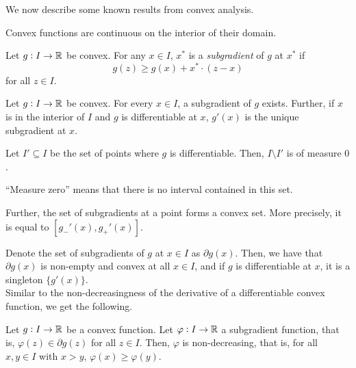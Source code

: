 		We now describe some known results from convex analysis.

		\begin{fact}
			Convex functions are continuous on the interior of their domain.
		\end{fact}

		\begin{definition}
			Let $g : I \to \mathbb{R}$ be convex. For any $x \in I$, $x^*$ is a \emph{subgradient} of $g$ at $x^*$ if
			\[ g(z) \ge g(x) + x^*\cdot(z-x) \]
			for all $z \in I$.
		\end{definition}


		\begin{fact}
			Let $g : I \to \mathbb{R}$ be convex. For every $x \in I$, a subgradient of $g$ exists. Further, if $x$ is in the interior of $I$ and $g$ is differentiable at $x$, $g'(x)$ is the unique subgradient at $x$.
		\end{fact}

		\begin{fact}
			Let $I' \subseteq I$ be the set of points where $g$ is differentiable. Then, $I \setminus I'$ is of measure $0$.
		\end{fact}
		``Measure zero'' means that there is no interval contained in this set.

		\begin{fact}
			 Further, the set of subgradients at a point forms a convex set. More precisely, it is equal to $[g_-'(x),g_+'(x)]$.
		\end{fact}

		Denote the set of subgradients of $g$ at $x \in I$ as $\partial g(x)$. Then, we have that $\partial g(x)$ is non-empty and convex at all $x \in I$, and if $g$ is differentiable at $x$, it is a singleton $\{g'(x)\}$.\\
		Similar to the non-decreasingness of the derivative of a differentiable convex function, we get the following.

		\begin{lemma}
			\label{lem: subgrad nondec}
			Let $g : I \to \mathbb{R}$ be a convex function. Let $\varphi : I \to \mathbb{R}$ a subgradient function, that is, $\varphi(z) \in \partial g(z)$ for all $z \in I$. Then, $\varphi$ is non-decreasing, that is, for all $x,y \in I$ with $x > y$, $\varphi(x) \ge \varphi(y)$.
		\end{lemma}

